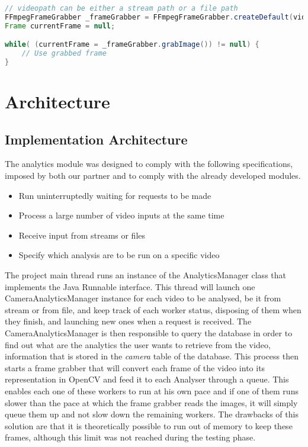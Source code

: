 \begin{lstlisting}[float,language=Java, label=src:ffmpegframegrabber, caption=FFmpegFrameGrabber usage example] 
// videopath can be either a stream path or a file path
FFmpegFrameGrabber _frameGrabber = FFmpegFrameGrabber.createDefault(videopath);
Frame currentFrame = null;

while( (currentFrame = _frameGrabber.grabImage()) != null) {
	// Use grabbed frame
}
\end{lstlisting}

\section{Architecture}

\subsection{Implementation Architecture}


The analytics module was designed to comply with the following specifications, imposed by both our partner and to comply with the already developed modules. 

\begin{itemize}
	\item Run uninterruptedly waiting for requests to be made
	\item Process a large number of video inputs at the same time
	\item Receive input from streams or files
	\item Specify which analysis are to be run on a specific video
\end{itemize}

The project main thread runs an instance of the AnalyticsManager class that implements the Java Runnable interface. This thread will launch one CameraAnalyticsManager instance for each video to be analysed, be it from stream or from file, and keep track of each worker status, disposing of them when they finish, and launching new ones when a request is received. The CameraAnalyticsManager is then responsible to query the database in order to find out what are the analytics the user wants to retrieve from the video, information that is stored in the \textit{camera} table of the database. This process then starts a frame grabber that will convert each frame of the video into its representation in OpenCV and feed it to each Analyser through a queue. This enables each one of these workers to run at his own pace and if one of them runs slower than the pace at which the frame grabber reads the images, it will simply queue them up and not slow down the remaining workers. The drawbacks of this solution are that it is theoretically possible to run out of memory to keep these frames, although this limit was not reached during the testing phase.

